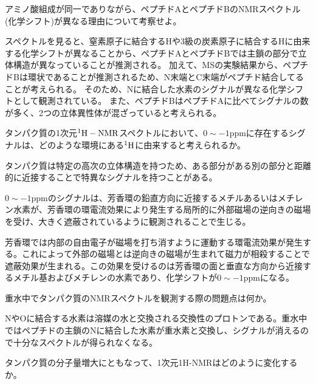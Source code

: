 \documentclass[a4paper,papersize,dvipdfmx]{jsarticle}
\begin{document}
\begin{tcolorbox}[colback=white,colbacktitle=black!10!white,coltitle=black,title={4}]
アミノ酸組成が同一でありながら、ペプチドAとペプチドBのNMRスペクトル(化学シフト)が異なる理由について考察せよ。
\end{tcolorbox}


スペクトルを見ると、窒素原子に結合するHや3級の炭素原子に結合するHに由来する化学シフトが異なることから、ペプチドAとペプチドBでは主鎖の部分で立体構造が異なっていることが推測される。
加えて、MSの実験結果から、ペプチドBは環状であることが推測されるため、N末端とC末端がペプチド結合してることが考えられる。
そのため、Nに結合した水素のシグナルが異なる化学シフトとして観測されている。
また、ペプチドBはペプチドAに比べてシグナルの数が多く、2つの立体異性体が混ざっていると考えられる。

\begin{tcolorbox}[colback=white,colbacktitle=black!10!white,coltitle=black,title={5}]
タンパク質の1次元$\rm ^1H-NMR$スペクトルにおいて、$0\sim-1$ppmに存在するシグナルは、どのような環境にある$\rm ^1H$に由来すると考えられるか。
\end{tcolorbox}

タンパク質は特定の高次の立体構造を持つため、ある部分がある別の部分と距離的に近接することで特異なシグナルを持つことがある。

$0\sim-1$ppmのシグナルは、芳香環の鉛直方向に近接するメチルあるいはメチレン水素が、芳香環の環電流効果により発生する局所的に外部磁場の逆向きの磁場を受け、大きく遮蔽されているように観測されることで生じる。

芳香環では内部の自由電子が磁場を打ち消すように運動する環電流効果が発生する。これによって外部の磁場とは逆向きの磁場が生まれて磁力が相殺することで遮蔽効果が生まれる。この効果を受けるのは芳香環の面と垂直な方向から近接するメチル基およびメチレンの水素であり、化学シフトが$0\sim-1$ppmになる。

\begin{tcolorbox}[colback=white,colbacktitle=black!10!white,coltitle=black,title={6}]
重水中でタンパク質のNMRスペクトルを観測する際の問題点は何か。
\end{tcolorbox}

NやOに結合する水素は溶媒の水と交換される交換性のプロトンである。重水中ではペプチドの主鎖のNに結合した水素が重水素と交換し、シグナルが消えるので十分なスペクトルが得られなくなる。

\begin{tcolorbox}[colback=white,colbacktitle=black!10!white,coltitle=black,title={7}]
タンパク質の分子量増大にともなって、1次元1H-NMRはどのように変化するか。
\end{tcolorbox}
\end{document}
